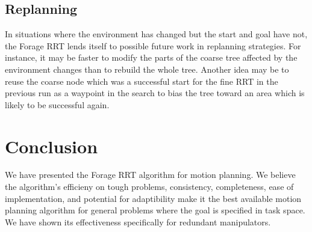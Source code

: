 \documentclass[conference]{IEEEtran}
\begin{document}
\subsection{Replanning}
In situations where the environment has changed but the start and goal have not, the Forage RRT lends itself to possible future work in
replanning strategies. For instance, it may be faster to modify the parts of the coarse tree affected by the environment changes than to
rebuild the whole tree. Another idea may be to reuse the coarse node which was a successful start for the fine RRT in the previous run as a
waypoint in the search to bias the tree toward an area which is likely to be successful again.

\section{Conclusion}
We have presented the Forage RRT algorithm for motion planning. We believe the algorithm's efficieny on tough problems, consistency,
completeness, ease of implementation, and potential for adaptibility make it the best available motion planning algorithm for general
problems where the goal is specified in task space. We have shown its effectiveness specifically for redundant manipulators.



\end{document}
